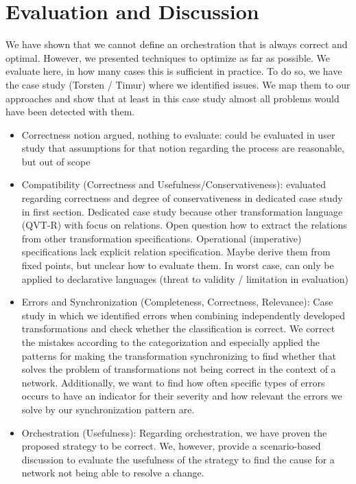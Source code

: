 \chapter{Evaluation and Discussion 
}
\label{chap:correctness_evaluation}


We have shown that we cannot define an orchestration that is always correct and optimal. However, we presented techniques to optimize as far as possible.
We evaluate here, in how many cases this is sufficient in practice. To do so, we have the case study (Torsten / Timur) where we identified issues. We map them to our approaches and show that at least in this case study almost all problems would have been detected with them.

\begin{itemize}
    \item Correctness notion argued, nothing to evaluate: could be evaluated in user study that assumptions for that notion regarding the process are reasonable, but out of scope
    \item Compatibility (Correctness and Usefulness/Conservativeness): evaluated regarding correctness and degree of conservativeness in dedicated case study in first section. Dedicated case study because other transformation language (QVT-R) with focus on relations. Open question how to extract the relations from other transformation specifications. Operational (imperative) specifications lack explicit relation specification. Maybe derive them from fixed points, but unclear how to evaluate them. In worst case, can only be applied to declarative languages (threat to validity / limitation in evaluation)
    \item Errors and Synchronization (Completeness, Correctness, Relevance): Case study in which we identified errors when combining independently developed transformations and check whether the classification is correct. We correct the mistakes according to the categorization and especially applied the patterns for making the transformation synchronizing to find whether that solves the problem of transformations not being correct in the context of a network. Additionally, we want to find how often specific types of errors occurs to have an indicator for their severity and how relevant the errors we solve by our synchronization pattern are.
    \item Orchestration (Usefulness): Regarding orchestration, we have proven the proposed strategy to be correct. We, however, provide a scenario-based discussion to evaluate the usefulness of the strategy to find the cause for a network not being able to resolve a change.
\end{itemize}

